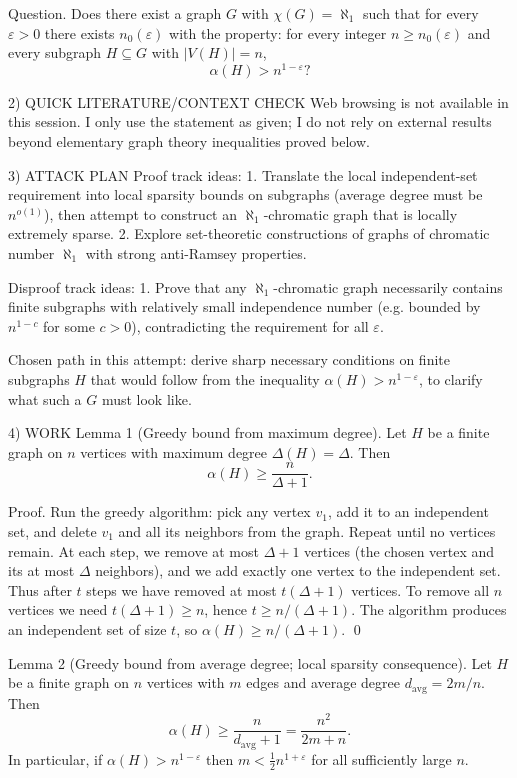 Question.
Does there exist a graph $G$ with $\chi(G)=\aleph_1$ such that for every $\varepsilon>0$ there exists $n_0(\varepsilon)$ with the property:
for every integer $n\ge n_0(\varepsilon)$ and every subgraph $H\subseteq G$ with $|V(H)|=n$,
\[\alpha(H) > n^{1-\varepsilon}?\]

2) QUICK LITERATURE/CONTEXT CHECK
Web browsing is not available in this session.
I only use the statement as given; I do not rely on external results beyond elementary graph theory inequalities proved below.

3) ATTACK PLAN
Proof track ideas:
1. Translate the local independent-set requirement into local sparsity bounds on subgraphs (average degree must be $n^{o(1)}$), then attempt to construct an $\aleph_1$-chromatic graph that is locally extremely sparse.
2. Explore set-theoretic constructions of graphs of chromatic number $\aleph_1$ with strong anti-Ramsey properties.

Disproof track ideas:
1. Prove that any $\aleph_1$-chromatic graph necessarily contains finite subgraphs with relatively small independence number (e.g. bounded by $n^{1-c}$ for some $c>0$), contradicting the requirement for all $\varepsilon$.

Chosen path in this attempt: derive sharp necessary conditions on finite subgraphs $H$ that would follow from the inequality $\alpha(H)>n^{1-\varepsilon}$, to clarify what such a $G$ must look like.

4) WORK
Lemma 1 (Greedy bound from maximum degree).
Let $H$ be a finite graph on $n$ vertices with maximum degree $\Delta(H)=\Delta$.
Then
\[\alpha(H)\ge \frac{n}{\Delta+1}.\]

Proof.
Run the greedy algorithm: pick any vertex $v_1$, add it to an independent set, and delete $v_1$ and all its neighbors from the graph.
Repeat until no vertices remain.
At each step, we remove at most $\Delta+1$ vertices (the chosen vertex and its at most $\Delta$ neighbors), and we add exactly one vertex to the independent set.
Thus after $t$ steps we have removed at most $t(\Delta+1)$ vertices. To remove all $n$ vertices we need $t(\Delta+1)\ge n$, hence $t\ge n/(\Delta+1)$.
The algorithm produces an independent set of size $t$, so $\alpha(H)\ge n/(\Delta+1)$. \qed

Lemma 2 (Greedy bound from average degree; local sparsity consequence).
Let $H$ be a finite graph on $n$ vertices with $m$ edges and average degree $d_{\mathrm{avg}}=2m/n$.
Then
\[\alpha(H)\ge \frac{n}{d_{\mathrm{avg}}+1}=\frac{n^2}{2m+n}.\]
In particular, if $\alpha(H)>n^{1-\varepsilon}$ then $m<\tfrac12 n^{1+\varepsilon}$ for all sufficiently large $n$.

